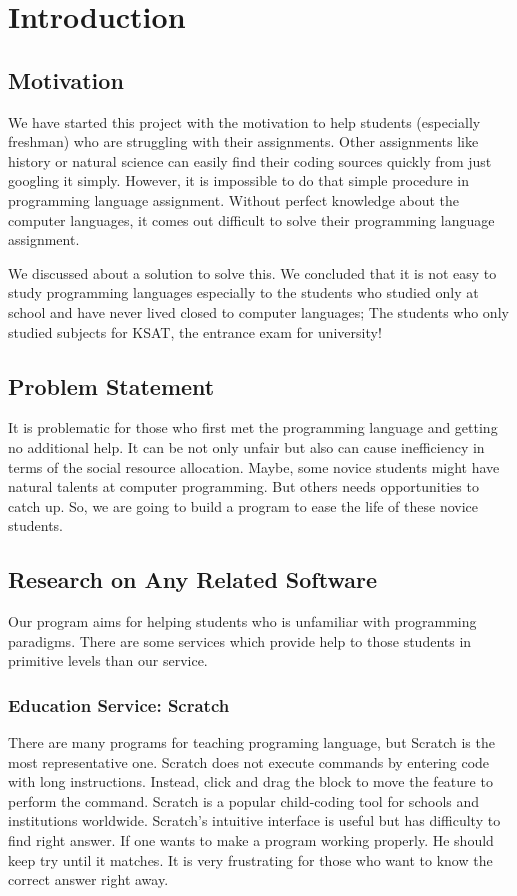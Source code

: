 \documentclass[conference]{IEEEtran}
\begin{document}
\IEEEpeerreviewmaketitle


\section{Introduction}

\subsection{Motivation}
We have started this project with the motivation to help students (especially freshman) who are struggling with their assignments. Other assignments like history or natural science can easily find their coding sources quickly from just googling it simply. However, it is impossible to do that simple procedure in programming language assignment. Without perfect knowledge about the computer languages, it comes out difficult to solve their programming language assignment. 

We discussed about a solution to solve this. We concluded that it is not easy to study programming languages especially to the students who studied only at school and have never lived closed to computer languages; The students who only studied subjects for KSAT, the entrance exam for university!

\subsection{Problem Statement}
It is problematic for those who first met the programming language and getting no additional help. It can be not only unfair but also can cause inefficiency in terms of the social resource allocation. Maybe, some novice students might have natural talents at computer programming. But others needs opportunities to catch up. So, we are going to build a program to ease the life of these novice students.


\subsection{Research on Any Related Software}
Our program aims for helping students who is unfamiliar with programming paradigms. There are some services which provide help to those students in primitive levels than our service.

\subsubsection{Education Service: Scratch}
There are many programs for teaching programing language, but Scratch is the most representative one. Scratch does not execute commands by entering code with long instructions. Instead, click and drag the block to move the feature to perform the command. Scratch is a popular child-coding tool for schools and institutions worldwide. Scratch's intuitive interface is useful but has difficulty to find right answer. If one wants to make a program working properly. He should keep try until it matches. It is very frustrating for those who want to know the correct answer right away.
\end{document}
